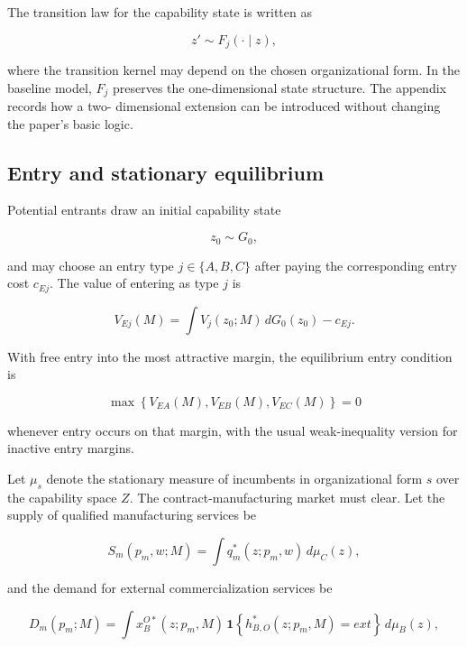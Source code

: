\documentclass[12pt]{article}
\begin{document}
The transition law for the capability state is written as

\begin{equation}
z' \sim F_j(\cdot\mid z),
\end{equation}

where the transition kernel may depend on the chosen organizational form. In the baseline
model, $F_j$ preserves the one-dimensional state structure. The appendix records how a two-
dimensional extension can be introduced without changing the paper's basic logic.

\subsection{Entry and stationary equilibrium}

Potential entrants draw an initial capability state

\[
z_0 \sim G_0,
\]

and may choose an entry type $j\in\{A,B,C\}$ after paying the corresponding entry cost $c_{Ej}$.
The value of entering as type $j$ is

\begin{equation}
V_{Ej}(M)=\int V_j(z_0;M)\,dG_0(z_0)-c_{Ej}.
\end{equation}

With free entry into the most attractive margin, the equilibrium entry condition is

\begin{equation}
\max\left\{V_{EA}(M),V_{EB}(M),V_{EC}(M)\right\}=0
\end{equation}

whenever entry occurs on that margin, with the usual weak-inequality version for inactive
entry margins.

Let $\mu_s$ denote the stationary measure of incumbents in organizational form $s$ over the
capability space $Z$. The contract-manufacturing market must clear. Let the supply of
qualified manufacturing services be

\begin{equation}
S_m(p_m,w;M)=\int q_m^*(z;p_m,w)\,d\mu_C(z),
\end{equation}

and the demand for external commercialization services be

\begin{equation}
D_m(p_m;M)=\int x_B^{O*}(z;p_m,M)\,\mathbf{1}\!\left\{h_{B,O}^*(z;p_m,M)=ext\right\}\,d\mu_B(z),
\end{equation}
\end{document}
